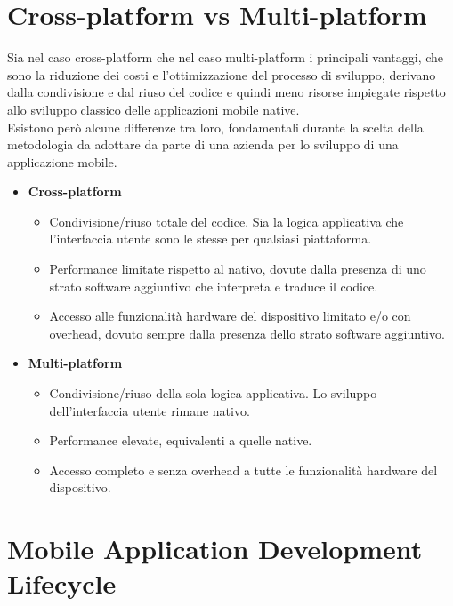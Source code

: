 \section{Cross-platform vs Multi-platform}
Sia nel caso cross-platform che nel caso multi-platform i principali vantaggi, che sono la riduzione dei costi e l'ottimizzazione del processo di sviluppo, derivano dalla condivisione e dal riuso del codice e quindi meno risorse impiegate rispetto allo sviluppo classico delle applicazioni mobile native.\\
Esistono però alcune differenze tra loro, fondamentali durante la scelta della metodologia da adottare da parte di una azienda per lo sviluppo di una applicazione mobile.
\begin{itemize}
    \item \textbf{Cross-platform}
    \begin{itemize}
        \item Condivisione/riuso totale del codice. Sia la logica applicativa che l'interfaccia utente sono le stesse per qualsiasi piattaforma.
        \item Performance limitate rispetto al nativo, dovute dalla presenza di uno strato software aggiuntivo che interpreta e traduce il codice.
        \item Accesso alle funzionalità hardware del dispositivo limitato e/o con overhead, dovuto sempre dalla presenza dello strato software aggiuntivo.
    \end{itemize}
    \item \textbf{Multi-platform}
    \begin{itemize}
        \item Condivisione/riuso della sola logica applicativa. Lo sviluppo dell'interfaccia utente rimane nativo.
        \item Performance elevate, equivalenti a quelle native.
        \item Accesso completo e senza overhead a tutte le funzionalità hardware del dispositivo.
    \end{itemize}
\end{itemize}

\section{Mobile Application Development Lifecycle}

